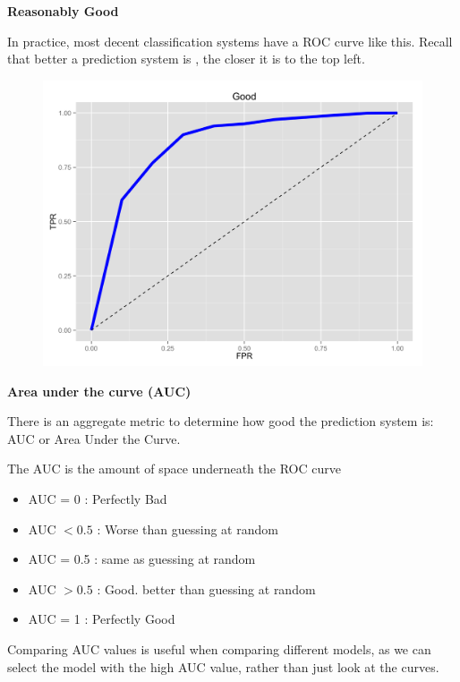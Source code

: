\documentclass[SKL-MASTER.tex]{subfiles}
\begin{document}
\newpage
\noindent \textbf{Reasonably Good}


In practice, most decent classification systems have a ROC curve like this.  Recall that better a prediction system is , the closer it is to the top left.
\begin{figure}[h!]
\centering
\includegraphics[width=0.9\linewidth]{images/roc-pretty-good}

\end{figure}

\newpage
\noindent \textbf{Area under the curve (AUC)}

\noindent There is an aggregate metric to determine how good the prediction system is:  AUC or Area Under the Curve. 

\noindent The AUC is the amount of space underneath the ROC curve

\begin{itemize}
\item AUC = 0 :  Perfectly Bad
\item AUC $< 0.5$ : Worse than guessing at random 
\item AUC = 0.5 : same as guessing at random
\item AUC $> 0.5$ : Good. better than guessing at random
\item AUC = 1 : Perfectly Good
\end{itemize}
%
%
%
\noindent Comparing AUC values is useful when comparing different models, as we can select the model with the high AUC value, rather than just look at the curves.
\end{document}
